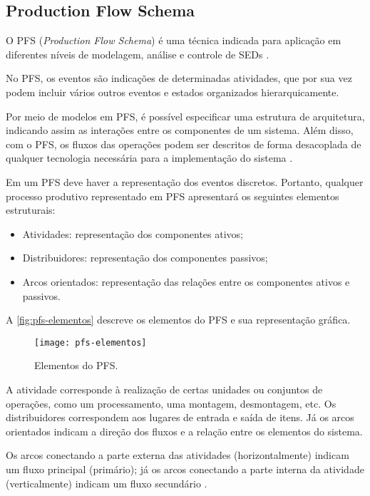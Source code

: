 	\subsection{Production Flow Schema}
	
	O PFS (\textit{Production Flow Schema}) é uma técnica indicada para aplicação em diferentes níveis de modelagem, análise e controle de SEDs \cite{miyagi1996controle}.
	
	No PFS, os eventos são indicações de determinadas atividades, que por sua vez podem incluir vários outros eventos e estados organizados hierarquicamente.
	
	Por meio de modelos em PFS, é possível especificar uma estrutura de arquitetura, indicando assim as interações entre os componentes de um sistema. Além disso, com o PFS, os fluxos das operações podem ser descritos de forma desacoplada de qualquer tecnologia necessária para a implementação do sistema \cite{pisching2018equipmentrami}.
	
	Em um PFS deve haver a representação dos eventos discretos. Portanto, qualquer processo produtivo representado em PFS apresentará os seguintes elementos estruturais:
	
	\begin{itemize}
		\item Atividades: representação dos componentes ativos;
		\item Distribuidores: representação dos componentes passivos;
		\item Arcos orientados: representação das relações entre os componentes ativos  e passivos.
	\end{itemize}

	A \autoref{fig:pfs-elementos} descreve os elementos do PFS e sua representação gráfica.
	
	\begin{figure}[htb]
		\centering
		\caption{Elementos do PFS.}
		\label{fig:pfs-elementos}
		\texttt{[image: pfs-elementos]}
	\end{figure}

	A atividade corresponde à realização de certas unidades ou conjuntos de operações, como um processamento, uma montagem, desmontagem, etc. Os distribuidores correspondem aos lugares de entrada e saída de itens. Já os arcos orientados indicam a direção dos fluxos e a relação entre os elementos do sistema.
	
	Os arcos conectando a parte externa das atividades (horizontalmente) indicam um fluxo principal (primário); já os arcos conectando a parte interna da atividade (verticalmente) indicam um fluxo secundário \cite{miyagi1996controle}. 
	
